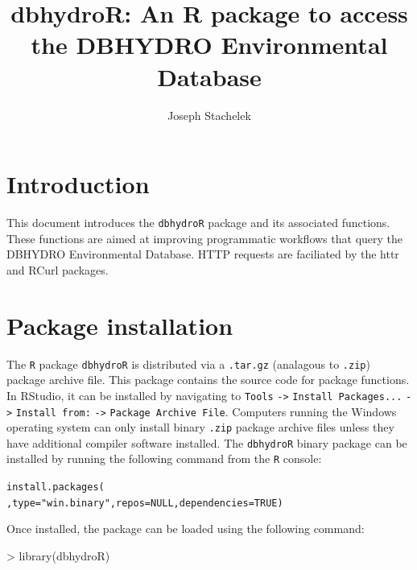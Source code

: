 \documentclass[12pt,notitlepage]{article}
\author{Joseph Stachelek}
\title{dbhydroR: An R package to access the DBHYDRO Environmental Database}
\begin{document}

\maketitle
 


\section{Introduction}

This document introduces the \texttt{dbhydroR} package and its associated functions. These functions are aimed at improving programmatic workflows that query the DBHYDRO Environmental Database. HTTP requests are faciliated by the httr \citep{httr} and RCurl \citep{rcurl} packages. 

\section{Package installation}

The \texttt{R} package \texttt{dbhydroR} is distributed via a \texttt{.tar.gz} (analagous to \texttt{.zip}) package archive file. This package contains the source code for package functions. In RStudio, it can be installed by navigating to \texttt{Tools} \verb|->| \texttt{Install Packages...} \verb|->| \texttt{Install from:} \verb|->| \texttt{Package Archive File}. Computers running the Windows operating system can only install binary \texttt{.zip} package archive files unless they have additional compiler software installed. The \texttt{dbhydroR} binary package can be installed by running the following command from the \texttt{R} console:

\vspace{10pt}
\noindent\texttt{install.packages(}\\
\texttt{,type="win.binary",repos=NULL,dependencies=TRUE)}
\vspace{8pt}

Once installed, the package can be loaded using the following command:



\begin{Schunk}
\begin{Sinput}
> library(dbhydroR)
\end{Sinput}
\end{Schunk}
\end{document}
